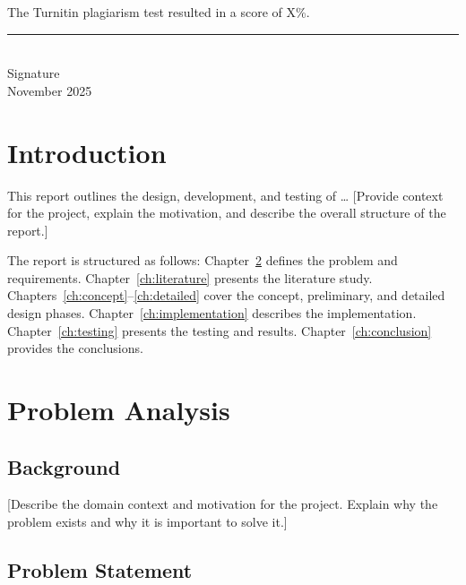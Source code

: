\documentclass[12pt, a4paper]{report}
\newcommand{\submissiondate}{November 2025}
\newcommand{\turnitinscore}{X\%}       %
\begin{document}
The Turnitin plagiarism test resulted in a score of \turnitinscore.

\vspace{20mm}
\noindent\rule{60mm}{0.4pt}\\[2pt]
Signature\\[12pt]
\submissiondate

\cleardoublepage
{}

\chapter{Introduction}
\label{ch:introduction}

This report outlines the design, development, and testing of \ldots{}
[Provide context for the project, explain the motivation, and
describe the overall structure of the report.]

The report is structured as follows: Chapter~\ref{ch:problem} defines
the problem and requirements. Chapter~\ref{ch:literature} presents
the literature study. Chapters~\ref{ch:concept}–\ref{ch:detailed}
cover the concept, preliminary, and detailed design phases.
Chapter~\ref{ch:implementation} describes the implementation.
Chapter~\ref{ch:testing} presents the testing and results.
Chapter~\ref{ch:conclusion} provides the conclusions.

\chapter{Problem Analysis}
\label{ch:problem}

\section{Background}
\label{sec:background}

[Describe the domain context and motivation for the project. Explain
why the problem exists and why it is important to solve it.]

\section{Problem Statement}
\label{sec:problem-statement}
\end{document}

